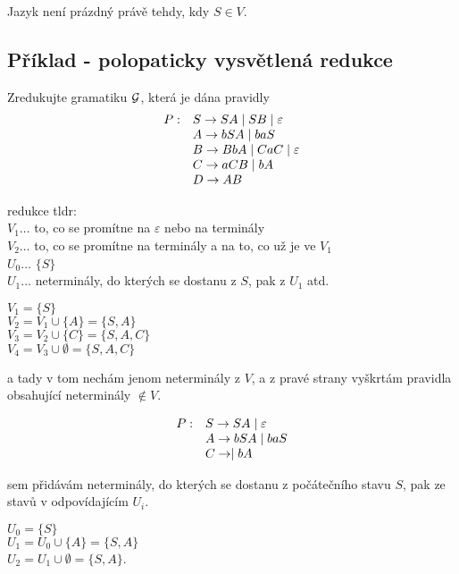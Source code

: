 Jazyk není prázdný právě tehdy, kdy $S \in V$. 

\subsection{Příklad - polopaticky vysvětlená redukce}

Zredukujte gramatiku $\mathcal{G}$, která je dána pravidly 
\[
    \begin{array}{l l}
        P: & S \rightarrow SA \mid SB \mid \varepsilon \\
           & A \rightarrow bSA \mid baS \\
           & B \rightarrow BbA \mid CaC \mid \varepsilon\\
           & C \rightarrow aCB \mid bA \\
           & D \rightarrow AB \\
    \end{array}
\]

redukce tldr:\\
$V_1\dots$ to, co se promítne na $\varepsilon$ nebo na terminály \\ 
$V_2\dots$ to, co se promítne na terminály a na to, co už je ve $V_1$ \\ 
$U_0\dots$ $\{S\}$ \\
$U_1\dots$ neterminály, do kterých se dostanu z $S$, pak z $U_1$ atd. 

$V_1 = \{S\}$\\ 
$V_2 = V_1 \cup \{A\} = \{S, A\}$\\ 
$V_3 = V_2 \cup \{C\} = \{S, A, C\}$\\ 
$V_4 = V_3 \cup \emptyset = \{S, A, C\}$ 

a tady v tom nechám jenom neterminály z $V$, a z pravé strany vyškrtám pravidla obsahující neterminály $\notin V$. 

\[
    \begin{array}{l l}
        P: & S \rightarrow SA \mid \varepsilon \\
           & A \rightarrow bSA \mid baS \\
           & C \rightarrow \mid bA \\
    \end{array}
\]

sem přidávám neterminály, do kterých se dostanu z počátečního stavu $S$, pak ze stavů v odpovídajícím $U_i$. 

$U_0 = \{S\}$\\ 
$U_1 = U_0 \cup \{A\} = \{S, A\}$ \\
$U_2 = U_1 \cup \emptyset = \{S, A\}$. 

